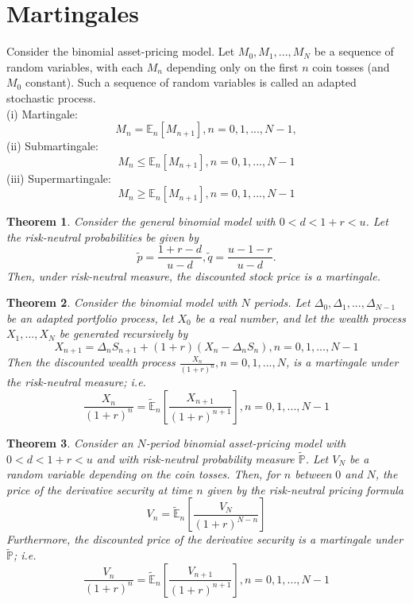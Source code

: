 \documentclass[a4paper]{article}
\newtheorem{thm}{Theorem}
\begin{document}
\section{Martingales}
Consider the binomial asset-pricing model. Let $M_0, M_1,...,M_N$ be a sequence of random variables, with each $M_n$ depending only on the first $n$ coin tosses (and $M_0$ constant). Such a sequence of random variables is called an adapted stochastic process. \\
(i) Martingale: 
$$M_n = \mathbb{E}_n[M_{n+1}], n=0,1,...,N-1,$$
(ii) Submartingale:
$$M_n \le \mathbb{E}_n[M_{n+1}], n=0,1,...,N-1$$
(iii) Supermartingale:
$$M_n \ge \mathbb{E}_n[M_{n+1}], n=0,1,...,N-1$$
\begin{thm}
Consider the general binomial model with $0<d<1+r<u$. Let the risk-neutral probabilities be given by
$$\tilde{p}=\frac{1+r-d}{u-d}, \tilde{q}=\frac{u-1-r}{u-d}.$$
Then, under risk-neutral measure, the discounted stock price is a martingale.
\end{thm}
\begin{thm}
Consider the binomial model with $N$ periods. Let $\Delta_0,\Delta_1,...,\Delta_{N-1}$ be an adapted portfolio process, let $X_0$ be a real number, and let the wealth process $X_1,...,X_N$ be generated recursively by 
$$X_{n+1}=\Delta_nS_{n+1}+(1+r)(X_n-\Delta_nS_n), n=0,1,...,N-1$$
Then the discounted wealth process $\frac{X_n}{(1+r)^n}, n=0,1,...,N$, is a martingale under the risk-neutral measure; i.e. 
$$\frac{X_n}{(1+r)^n}=\tilde{\mathbb{E}}_n\left[\frac{X_{n+1}}{(1+r)^{n+1}}\right],n=0,1,...,N-1$$
\end{thm}
\begin{thm}Consider an $N$-period binomial asset-pricing model with $0<d<1+r<u$ and with risk-neutral probability measure $\tilde{\mathbb{P}}$. Let $V_N$ be a random variable depending on the coin tosses. Then, for $n$ between $0$ and $N$, the price of the derivative security at time $n$ given by the risk-neutral pricing formula
$$V_n=\tilde{\mathbb{E}}_n\left[\frac{V_N}{(1+r)^{N-n}}\right]$$
Furthermore, the discounted price of the derivative security is a martingale under $\tilde{\mathbb{P}}$; i.e. 
$$\frac{V_n}{(1+r)^n}=\tilde{\mathbb{E}}_n\left[\frac{V_{n+1}}{(1+r)^{n+1}}\right], n=0,1,...,N-1$$
\end{thm}
\end{document}
